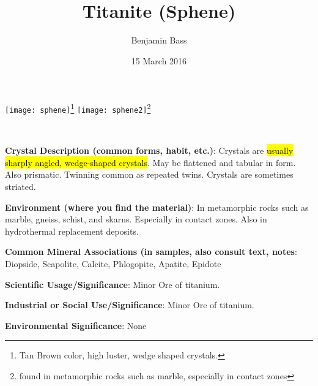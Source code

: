 \documentclass[10pt]{article}
\author{Benjamin Bass}
\date{15 March 2016}
\title{\vspace{-2.0cm} Titanite (Sphene)} %
\begin{document}
\maketitle


\begin{center}
  \texttt{[image: sphene]}\footnote{Tan Brown color, high luster, wedge shaped crystals.}
  \texttt{[image: sphene2]}\footnote{found in metamorphic rocks such as marble, especially in contact zones}
\end{center}



\
\
\
\
\
\
\
\
\
\

\begin{framed}
  \textbf{Crystal Description (common forms, habit, etc.)}: Crystals are \hl{usually sharply angled, wedge-shaped crystals}. May be flattened and tabular in form. Also prismatic. Twinning common as repeated twins. Crystals are sometimes striated.
\end{framed}

\begin{framed}
  \textbf{Environment (where you find the material)}: In metamorphic rocks such as marble, gneiss, schist, and skarns. Especially in contact zones. Also in hydrothermal replacement deposits.
\end{framed}

\begin{framed}
  \textbf{Common Mineral Associations (in samples, also consult text, notes}: Diopside, Scapolite, Calcite, Phlogopite, Apatite, Epidote
\end{framed}

\begin{framed}
  \textbf{Scientific Usage/Significance}: Minor Ore of titanium.
\end{framed}

\begin{framed}
  \textbf{Industrial or Social Use/Significance}: Minor Ore of titanium.
\end{framed}

\begin{framed}
  \textbf{Environmental Significance}: None
\end{framed}

\end{document}
